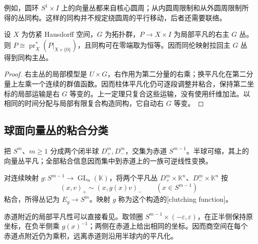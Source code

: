 例如，圆环 \(S^1\times I\) 上的向量丛都来自核心圆周；从内圆周限制和从外圆周限制所得的丛同构。这样的同构并不规定绕圆周的平行移动，后者还需要联络。

\begin{corollary}\label{g2:cor:principal-bundle-homotopy}
	设 \(X\) 为仿紧 Hausdorff 空间，\(G\) 为拓扑群，\(P\to X\times I\) 为局部平凡的右主 \(G\) 丛。则 \(P\cong\operatorname{pr}_X^*(P|_{X\times\{0\}})\)，且同构可在零端取为恒等。因而同伦映射拉回主 \(G\) 丛得到同构主丛。
\end{corollary}
\begin{proof}
	右主丛的局部模型是 \(U\times G\)，右作用为第二分量的右乘；换平凡化在第二分量上左乘一个连续的群值函数。因而柱体平凡化仍可逐段调整并粘合，保持第二坐标的局部运输是右 \(G\) 等变的。上一定理只复合这些运输，没有使用纤维加法。以相同的时间分配与局部有限复合构造同构，它自动右 \(G\) 等变。
\end{proof}

\subsection{球面向量丛的粘合分类}
\label{g2:subsec:1901:04}

把 \(S^m\)、\(m\ge1\) 分成两个闭半球 \(D_+^m,D_-^m\)，交集为赤道 \(S^{m-1}\)。半球可缩，其上的向量丛平凡；全部粘合信息因而集中到赤道上的一族可逆线性变换。

\begin{definition}\label{g2:def:clutching-bundle}
	对连续映射 \(g:S^{m-1}\to\operatorname{GL}_n(\mathbb K)\)，将两个平凡丛 \(D_+^m\times\mathbb K^n\)、\(D_-^m\times\mathbb K^n\) 按
	\[
		(x,v)_+\sim(x,g(x)v)_-\qquad(x\in S^{m-1})
	\]
	粘合，所得丛记为 \(E_g\to S^m\)。映射 \(g\) 称为这个构造的[clutching function]。
\end{definition}

赤道附近的局部平凡性可以直接看见。取领圈 \(S^{m-1}\times(-\varepsilon,\varepsilon)\)，在正半侧保持原坐标，在负半侧乘 \(g(x)^{-1}\)；两侧在赤道上给出相同的坐标。因而商空间在每个赤道点附近仍为乘积，远离赤道则沿用半球内的平凡化。

